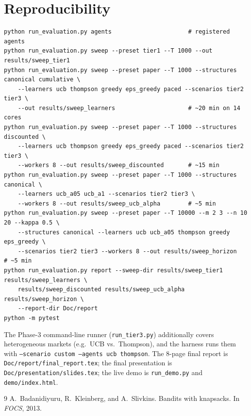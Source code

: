 \documentclass[11pt]{article}
\theoremstyle{remark}
\begin{document}
\section{Reproducibility}
\begin{verbatim}
python run_evaluation.py agents                      # registered agents
python run_evaluation.py sweep --preset tier1 --T 1000 --out results/sweep_tier1
python run_evaluation.py sweep --preset paper --T 1000 --structures canonical cumulative \
    --learners ucb thompson greedy eps_greedy paced --scenarios tier2 tier3 \
    --out results/sweep_learners                     # ~20 min on 14 cores
python run_evaluation.py sweep --preset paper --T 1000 --structures discounted \
    --learners ucb thompson greedy eps_greedy paced --scenarios tier2 tier3 \
    --workers 8 --out results/sweep_discounted       # ~15 min
python run_evaluation.py sweep --preset paper --T 1000 --structures canonical \
    --learners ucb_a05 ucb_a1 --scenarios tier2 tier3 \
    --workers 8 --out results/sweep_ucb_alpha        # ~5 min
python run_evaluation.py sweep --preset paper --T 10000 --m 2 3 --n 10 20 --kappa 0.5 \
    --structures canonical --learners ucb ucb_a05 thompson greedy eps_greedy \
    --scenarios tier2 tier3 --workers 8 --out results/sweep_horizon   # ~5 min
python run_evaluation.py report --sweep-dir results/sweep_tier1 results/sweep_learners \
    results/sweep_discounted results/sweep_ucb_alpha results/sweep_horizon \
    --report-dir Doc/report
python -m pytest
\end{verbatim}
The Phase-3 command-line runner (\texttt{run\_tier3.py}) additionally covers heterogeneous markets
(e.g.\ UCB vs.\ Thompson), and the harness runs them with \texttt{--scenario custom --agents ucb thompson}.
The 8-page final report is \texttt{Doc/report/final\_report.tex}; the final presentation is \texttt{Doc/presentation/slides.tex}; the live demo is \texttt{run\_demo.py} and \texttt{demo/index.html}.

\begin{thebibliography}{9}
\bibitem{badanidiyuru2013bandits}
A.~Badanidiyuru, R.~Kleinberg, and A.~Slivkins.
\newblock Bandits with knapsacks.
\newblock In \emph{FOCS}, 2013.
\end{thebibliography}
\end{document}
